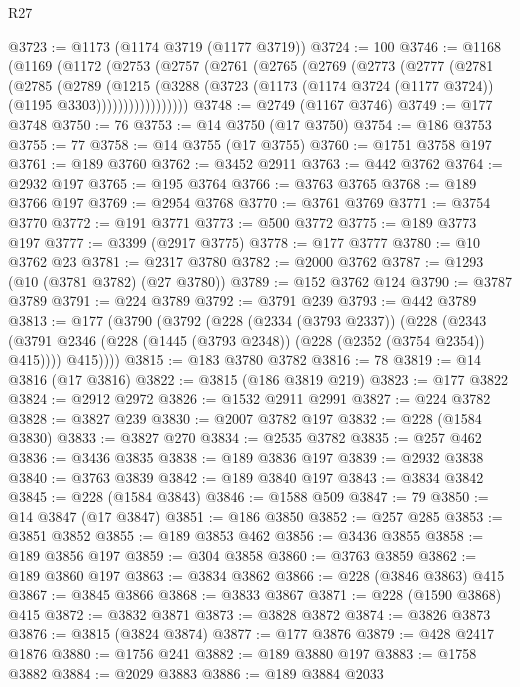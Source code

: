 \begin{lexlean}{R27}
\begin{coremodule}
@3723 := @1173 (@1174 @3719 (@1177 @3719))
@3724 := 100
@3746 := @1168
    (@1169
      (@1172
        (@2753
          (@2757
            (@2761
              (@2765
                (@2769
                  (@2773
                    (@2777
                      (@2781
                        (@2785
                          (@2789
                            (@1215
                              (@3288
                                (@3723
                                  (@1173 (@1174 @3724 (@1177 @3724)) (@1195 @3303)))))))))))))))))
@3748 := @2749 (@1167 @3746)
@3749 := @177 @3748
@3750 := 76
@3753 := @14 @3750 (@17 @3750)
@3754 := @186 @3753
@3755 := 77
@3758 := @14 @3755 (@17 @3755)
@3760 := @1751 @3758 @197
@3761 := @189 @3760
@3762 := @3452 @2911
@3763 := @442 @3762
@3764 := @2932 @197
@3765 := @195 @3764
@3766 := @3763 @3765
@3768 := @189 @3766 @197
@3769 := @2954 @3768
@3770 := @3761 @3769
@3771 := @3754 @3770
@3772 := @191 @3771
@3773 := @500 @3772
@3775 := @189 @3773 @197
@3777 := @3399 (@2917 @3775)
@3778 := @177 @3777
@3780 := @10 @3762 @23
@3781 := @2317 @3780
@3782 := @2000 @3762
@3787 := @1293 (@10 (@3781 @3782) (@27 @3780))
@3789 := @152 @3762 @124
@3790 := @3787 @3789
@3791 := @224 @3789
@3792 := @3791 @239
@3793 := @442 @3789
@3813 := @177
    (@3790
      (@3792
        (@228
          (@2334 (@3793 @2337))
          (@228
            (@2343 (@3791 @2346 (@228 (@1445 (@3793 @2348)) (@228 (@2352 (@3754 @2354)) @415))))
            @415))))
@3815 := @183 @3780 @3782
@3816 := 78
@3819 := @14 @3816 (@17 @3816)
@3822 := @3815 (@186 @3819 @219)
@3823 := @177 @3822
@3824 := @2912 @2972
@3826 := @1532 @2911 @2991
@3827 := @224 @3782
@3828 := @3827 @239
@3830 := @2007 @3782 @197
@3832 := @228 (@1584 @3830)
@3833 := @3827 @270
@3834 := @2535 @3782
@3835 := @257 @462
@3836 := @3436 @3835
@3838 := @189 @3836 @197
@3839 := @2932 @3838
@3840 := @3763 @3839
@3842 := @189 @3840 @197
@3843 := @3834 @3842
@3845 := @228 (@1584 @3843)
@3846 := @1588 @509
@3847 := 79
@3850 := @14 @3847 (@17 @3847)
@3851 := @186 @3850
@3852 := @257 @285
@3853 := @3851 @3852
@3855 := @189 @3853 @462
@3856 := @3436 @3855
@3858 := @189 @3856 @197
@3859 := @304 @3858
@3860 := @3763 @3859
@3862 := @189 @3860 @197
@3863 := @3834 @3862
@3866 := @228 (@3846 @3863) @415
@3867 := @3845 @3866
@3868 := @3833 @3867
@3871 := @228 (@1590 @3868) @415
@3872 := @3832 @3871
@3873 := @3828 @3872
@3874 := @3826 @3873
@3876 := @3815 (@3824 @3874)
@3877 := @177 @3876
@3879 := @428 @2417 @1876
@3880 := @1756 @241
@3882 := @189 @3880 @197
@3883 := @1758 @3882
@3884 := @2029 @3883
@3886 := @189 @3884 @2033

\end{coremodule}
\end{lexlean}
